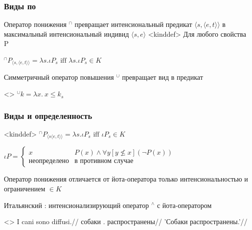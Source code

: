 \documentclass[9pt, t]{beamer}
\begin{document}
\begin{frame}
    \frametitle{Виды по \citep{chierchia1998,dayal2004}}

    Оператор понижения $^\cap$ превращает интенсиональный предикат $\langle s, \langle e,t\rangle\rangle$ в максимальный интенсиональный индивид $\langle s, e\rangle$
    \ex<kinddef>
        Для любого свойства P

        $^\cap P_{\langle s,\langle e,t\rangle\rangle} = \lambda s.\iota P_s \text{ iff }\lambda s.\iota P_s\in K$
    \xe


    \pause
    Симметричный оператор повышения $^\cup$ превращает вид в предикат

    \ex<>
        $^\cup k = \lambda x.\ x\le k_s$
    \xe

    \pause
    
\end{frame}

\begin{frame}
    \frametitle{Виды и определенность}

    \pex<kinddef>
        \a $^\cap P_{\langle s\langle e,t\rangle\rangle} = \lambda s.\iota P_s\text{ iff }\iota P_s \in K$

        \a $\iota P = \begin{cases}
            x & P(x)\land\forall y[y\not\le x](\neg P(x))\\
            \text{неопределено} & \text{в противном случае}
        \end{cases}$
    \xe

    \pause
    Оператор понижения отличается от йота-оператора только интенсиональностью и ограничением $\in K$
    
    Итальянский \citep{chierchia1998}: интенсионализирующий оператор $^\land$ с йота-оператором
    
    \ex<>
        \begingl
            \gla I cani sono diffusi.//
            \glb \Def{} собаки \Cop.\Pl{} распространены//
            \glft 'Собаки распространены.'//
        \endgl
    \xe

\end{frame}
\end{document}

